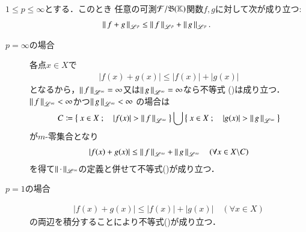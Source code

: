 \begin{itembox}[l]{}
	\begin{thm}[Minkowskiの不等式]
		$1 \leq p \leq \infty$とする．このとき
		任意の可測$\mathcal{F}/\mathfrak{B}(\mathbb{K})$関数$f,g$に対して次が成り立つ:
		\begin{align}
			\left\|\, f+g\, \right\|_{\mathscr{L}^p} \leq \left\|\, f\, \right\|_{\mathscr{L}^p} + \left\|\, g\, \right\|_{\mathscr{L}^p}. \label{ineq:minkowski}
		\end{align}
	\end{thm}
\end{itembox}
\begin{prf}\mbox{}
	\begin{description}
		\item[$p = \infty$の場合]
			各点$x \in X$で
			\begin{align}
				|f(x) + g(x)| \leq |f(x)| + |g(x)|
			\end{align}
			となるから，$\left\|\, f\, \right\|_{\mathscr{L}^\infty} = \infty$又は$\left\|\, g\, \right\|_{\mathscr{L}^\infty} = \infty$なら不等式
			()は成り立つ．$\left\|\, f\, \right\|_{\mathscr{L}^\infty} < \infty$かつ$\left\|\, g\, \right\|_{\mathscr{L}^\infty} < \infty$
			の場合は
			\begin{align}
				C \coloneqq \left\{\ x \in X\ ;\quad |f(x)| > \left\|\, f\, \right\|_{\mathscr{L}^\infty}\ \right\} \bigcup \left\{\ x \in X\ ;\quad |g(x)| > \left\|\, g\, \right\|_{\mathscr{L}^\infty}\ \right\}
			\end{align}
			が$m$-零集合となり
			\begin{align}
				|f(x) + g(x)| \leq \left\|\, f\, \right\|_{\mathscr{L}^\infty} + \left\|\, g\, \right\|_{\mathscr{L}^\infty} \quad (\forall x \in X \backslash C)
			\end{align}
			を得て$\left\|\, \cdot\, \right\|_{\mathscr{L}^\infty}$の定義と併せて不等式()が成り立つ．
		
		\item[$p = 1$の場合]
			\begin{align}
				|f(x) + g(x)| \leq |f(x)| + |g(x)| \quad (\forall x \in X)
			\end{align}
			の両辺を積分することにより不等式()が成り立つ．
		

\end{description}
\end{prf}
